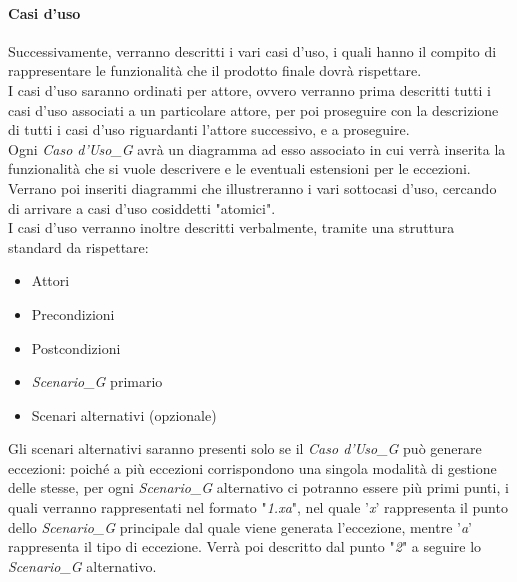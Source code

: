 \paragraph{Casi d'uso}
Successivamente, verranno descritti i vari casi d'uso, i quali hanno il compito di rappresentare le funzionalità che il prodotto finale dovrà rispettare. \\
I casi d'uso saranno ordinati per attore, ovvero verranno prima descritti tutti i casi d'uso associati a un particolare attore, per poi proseguire con la descrizione di tutti i casi d'uso riguardanti l'attore successivo, e a proseguire. \\
Ogni \textit{Caso d'Uso_G} avrà un diagramma ad esso associato in cui verrà inserita la funzionalità che si vuole descrivere e le eventuali estensioni per le eccezioni. Verrano poi inseriti diagrammi che illustreranno i vari sottocasi d'uso, cercando di arrivare a casi d'uso cosiddetti "atomici". \\
I casi d'uso verranno inoltre descritti verbalmente, tramite una struttura standard da rispettare:
\begin{itemize}
    \item Attori
    \item Precondizioni
    \item Postcondizioni
    \item \textit{Scenario_G} primario
    \item Scenari alternativi (opzionale)
\end{itemize}
\begin{comment}
I sottocasi d'uso non verranno descritti individualmente, poiché sarà già tutto descritto a livello atomico nello \textit{Scenario_G} principale del relativo \textit{Caso d'Uso_G} "padre".
\end{comment}
Gli scenari alternativi saranno presenti solo se il \textit{Caso d'Uso_G} può generare eccezioni: poiché a più eccezioni corrispondono una singola modalità di gestione delle stesse, per ogni \textit{Scenario_G} alternativo ci potranno essere più primi punti, i quali verranno rappresentati nel formato "\textit{1.xa}", nel quale '\textit{x}' rappresenta il punto dello \textit{Scenario_G} principale dal quale viene generata l'eccezione, mentre '\textit{a}' rappresenta il tipo di eccezione. Verrà poi descritto dal punto "\textit{2}" a seguire lo \textit{Scenario_G} alternativo.
